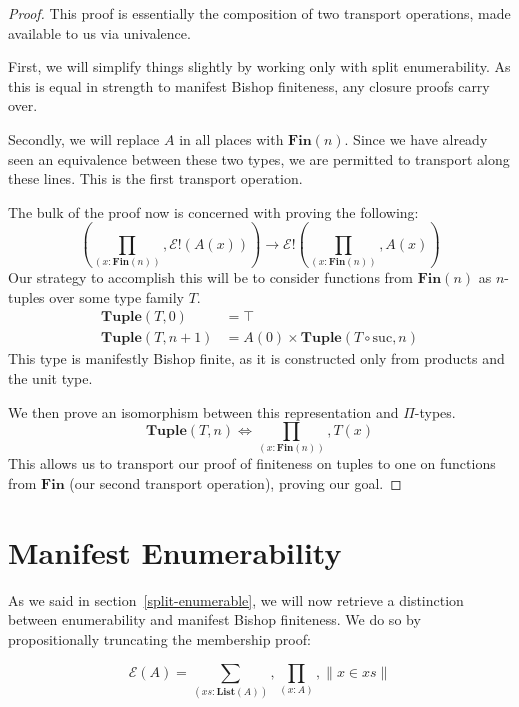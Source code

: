 \begin{proof}
  This proof is essentially the composition of two transport operations, made
  available to us via univalence.
  
  First, we will simplify things slightly by working only with split
  enumerability.
  As this is equal in strength to manifest Bishop finiteness, any closure proofs
  carry over.

  Secondly, we will replace \(A\) in all places with \(\mathbf{Fin}(n)\).
  Since we have already seen an equivalence between these two types, we are
  permitted to transport along these lines.
  This is the first transport operation.

  The bulk of the proof now is concerned with proving the following:
  \begin{equation}
    \left( \prod_{(x : \mathbf{Fin}(n))} , \mathcal{E}!(A(x)) \right) \rightarrow \mathcal{E}!\left( \prod_{(x : \mathbf{Fin}(n))} , A(x) \right)
  \end{equation}
  Our strategy to accomplish this will be to consider functions from
  \(\mathbf{Fin}(n)\) as \(n\)-tuples over some type family \(T\).
  \begin{equation}
    \begin{aligned}
      \mathbf{Tuple}(T, 0)   &= \top \\
      \mathbf{Tuple}(T, n+1) &= A(0) \times \mathbf{Tuple}(T \circ \text{suc}, n)
    \end{aligned}
  \end{equation}
  This type is manifestly Bishop finite, as it is constructed only from products
  and the unit type.
  
  We then prove an isomorphism between this representation and \(\Pi\)-types.
  \begin{equation}
    \mathbf{Tuple}(T, n) \iff \prod_{(x : \mathbf{Fin}(n))} , T(x)
  \end{equation}
  This allows us to transport our proof of finiteness on tuples to one on
  functions from \(\mathbf{Fin}\) (our second transport operation), proving our
  goal.
  
\end{proof}
\section{Manifest Enumerability} \label{manifest-enumerability}
As we said in section~\ref{split-enumerable}, we will now retrieve a distinction
between enumerability and manifest Bishop finiteness.
We do so by propositionally truncating the membership proof:
\begin{definition}
  \begin{equation}
    \mathcal{E}(A) = \sum_{(\mathit{xs} : \mathbf{List}(A))} , \prod_{(x : A)} , \lVert x \in \mathit{xs} \rVert
  \end{equation}
\end{definition}
